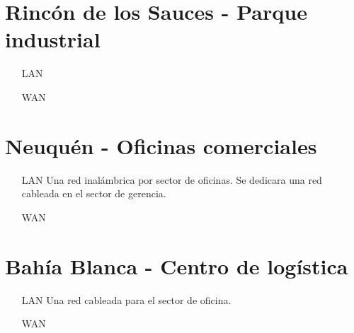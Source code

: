 \documentclass[11pt,a4paper]{article}
\begin{document}
    \section*{Rincón de los Sauces - Parque industrial}
        \begin{itemize}
        \item[LAN] %
            
        \item[WAN] %

        \end{itemize}

    \section*{Neuquén - Oficinas comerciales}
        \begin{itemize}
        
        \item[LAN] Una red inalámbrica por sector de oficinas. Se dedicara una red cableada en el sector de gerencia.
        
        \item[WAN] %

        \end{itemize}

    \section*{Bahía Blanca - Centro de logística}
        \begin{itemize}
        
        \item[LAN] Una red cableada para el sector de oficina.%
        
        \item[WAN] %

        \end{itemize}

    
\end{document}
